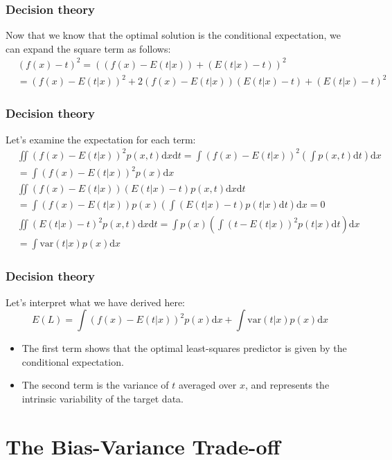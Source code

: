 \documentclass{beamer}
\begin{document}
\begin{frame}
    \frametitle{Decision theory}
    Now that we know that the optimal solution is the conditional expectation, we can expand the square term as follows:
    \begin{align*}
        &(f(x)-t)^{2}=((f(x)-E(t|x))+(E(t|x)-t))^{2} \\
        &=(f(x)-E(t|x))^{2}+2(f(x)-E(t|x))(E(t|x)-t)+(E(t|x)-t)^{2}
    \end{align*}
\end{frame}

\begin{frame}
    \frametitle{Decision theory}
    Let's examine the expectation for each term:
    \begin{align*}
        &\iint(f(x)-E(t|x))^{2}p(x,t)\mathrm{d}x\mathrm{d}t=\int(f(x)-E(t|x))^{2}(\int{}p(x,t)\mathrm{d}t)\mathrm{d}x \\
        &=\int(f(x)-E(t|x))^{2}p(x)\mathrm{d}x \\
        &\iint(f(x)-E(t|x))(E(t|x)-t)p(x,t)\mathrm{d}x\mathrm{d}t \\
        &=\int(f(x)-E(t|x))p(x)(\int(E(t|x)-t)p(t|x)\mathrm{d}t)\mathrm{d}x=0 \\
        &\iint(E(t|x)-t)^{2}p(x,t)\mathrm{d}x\mathrm{d}t=\int{}p(x)(\int(t-E(t|x))^{2}p(t|x)\mathrm{d}t)\mathrm{d}x \\
        &=\int\mathrm{var}(t|x)p(x)\mathrm{d}x
    \end{align*}
\end{frame}

\begin{frame}
    \frametitle{Decision theory}
    Let's interpret what we have derived here:
    \begin{equation*}
        E(L)=\int(f(x)-E(t|x))^{2}p(x)\mathrm{d}x+\int\mathrm{var}(t|x)p(x)\mathrm{d}x
    \end{equation*}
    \begin{itemize}
        \item The first term shows that the optimal least-squares predictor is given by the conditional expectation.
        \item The second term is the variance of $t$ averaged over $x$, and represents the intrinsic variability of the target data.
    \end{itemize}
\end{frame}

\section{The Bias-Variance Trade-off}
\end{document}
